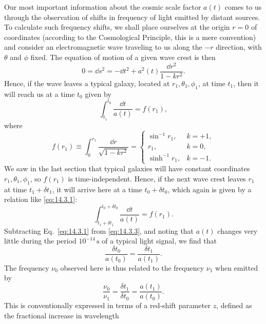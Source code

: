 Our most important information about the cosmic scale factor \(a(t)\) comes
to us through the observation of shifts in frequency of light emitted by
distant sources. To calculate such frequency shifts, we shall place ourselves
at the origin \(r=0\) of coordinates (according to the Cosmological Principle,
this is a mere convention) and consider an electromagnetic wave traveling to
us along the \(-r\) direction, with \(\theta\) and \(\phi\) fixed. The
equation of motion of a given wave crest is then
\[
  0=\dd s^2
  =
  -\dd t^2+a^2(t)\frac{\dd r^2}{1-kr^2}.
\]
Hence, if the wave leaves a typical galaxy, located at
\(r_1,\theta_1,\phi_1\), at time \(t_1\), then it will reach us at a time
\(t_0\) given by
\begin{equation}
  \int_{t_1}^{t_0}\frac{\dd t}{a(t)}=f(r_1),
  \tag{14.3.1}\label{eq:14.3.1}
\end{equation}
where
\begin{equation}
  f(r_1)
  \equiv
  \int_0^{r_1}\frac{\dd r}{\sqrt{1-kr^2}}
  =
  \begin{cases}
    \sin^{-1}r_1, & k=+1,\\
    r_1,          & k=0,\\
    \sinh^{-1}r_1,& k=-1.
  \end{cases}
  \tag{14.3.2}\label{eq:14.3.2}
\end{equation}
We saw in the last section that typical galaxies will have constant
coordinates \(r_1,\theta_1,\phi_1\), so \(f(r_1)\) is time-independent.
Hence, if the next wave crest leaves \(r_1\) at time \(t_1+\delta t_1\), it
will arrive here at a time \(t_0+\delta t_0\), which again is given by a
relation like \eqref{eq:14.3.1}:
\begin{equation}
  \int_{t_1+\delta t_1}^{t_0+\delta t_0}
  \frac{\dd t}{a(t)}
  =
  f(r_1).
  \tag{14.3.3}\label{eq:14.3.3}
\end{equation}
Subtracting Eq.~\eqref{eq:14.3.1} from \eqref{eq:14.3.3}, and noting that
\(a(t)\) changes very little during the period \(10^{-14}\,\mathrm{s}\) of a
typical light signal, we find that
\[
  \frac{\delta t_0}{a(t_0)}
  =
  \frac{\delta t_1}{a(t_1)}.
\]
The frequency \(\nu_0\) observed here is thus related to the frequency
\(\nu_1\) when emitted by
\begin{equation}
  \frac{\nu_0}{\nu_1}
  =
  \frac{\delta t_1}{\delta t_0}
  =
  \frac{a(t_1)}{a(t_0)}.
  \tag{14.3.4}\label{eq:14.3.4}
\end{equation}
This is conventionally expressed in terms of a red-shift parameter \(z\),
defined as the fractional increase in wavelength
